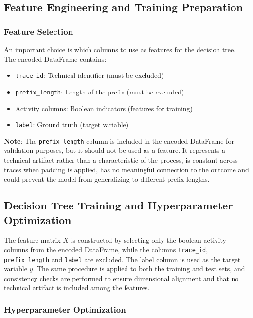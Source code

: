 \documentclass{article}
\begin{document}
\subsection{Feature Engineering and Training Preparation}

\subsubsection{Feature Selection}

An important choice is which columns to use as features for the decision tree. The encoded DataFrame contains:
\begin{itemize}
    \item \texttt{trace\_id}: Technical identifier (must be excluded)
    \item \texttt{prefix\_length}: Length of the prefix (must be excluded)
    \item Activity columns: Boolean indicators (features for training)
    \item \texttt{label}: Ground truth (target variable)
\end{itemize}

\noindent
\textbf{Note}: The \texttt{prefix\_length} column is included in the encoded DataFrame for validation purposes, but it should not be used as a feature. It represents a technical artifact rather than a characteristic of the process, is constant across traces when padding is applied, has no meaningful connection to the outcome and could prevent the model from generalizing to different prefix lengths.



\subsection{Decision Tree Training and Hyperparameter Optimization}

The feature matrix $X$ is constructed by selecting only the boolean activity columns from the encoded DataFrame, while the columns \texttt{trace\_id}, \texttt{prefix\_length} and \texttt{label} are excluded. The label column is used as the target variable $y$. The same procedure is applied to both the training and test sets, and consistency checks are performed to ensure dimensional alignment and that no technical artifact is included among the features.

\subsubsection{Hyperparameter Optimization}
\end{document}
